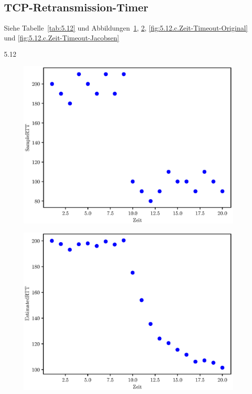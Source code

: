 \setcounter{section}{5}
\setcounter{subsection}{11} %
\subsection{TCP-Retransmission-Timer}

Siehe Tabelle~\ref{tab:5.12} und
Abbildungen~\ref{fig:5.12.c.Zeit-SampleRTT}, \ref{fig:5.12.c.Zeit-EstimatedRTT}, \ref{fig:5.12.c.Zeit-Timeout-Original} und \ref{fig:5.12.c.Zeit-Timeout-Jacobsen}

\FloatBarrier

\begin{table}[p]
    \centering
    {5.12}
    \caption{}
    \label{tab:5.12}
\end{table}

\FloatBarrier

\begin{figure}[p]
    \centering
    \includegraphics[width=1\textwidth]{./assets/5.12.c.Zeit-SampleRTT.eps}
    \caption{}
    \label{fig:5.12.c.Zeit-SampleRTT}
\end{figure}

\begin{figure}[p]
    \centering
    \includegraphics[width=1\textwidth]{./assets/5.12.c.Zeit-EstimatedRTT.eps}
    \caption{}
    \label{fig:5.12.c.Zeit-EstimatedRTT}
\end{figure}

